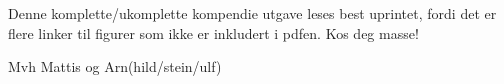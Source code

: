 
Denne komplette/ukomplette kompendie utgave leses best uprintet, fordi det er flere linker til figurer som ikke er inkludert i pdfen. Kos deg masse!

Mvh Mattis og Arn(hild/stein/ulf)